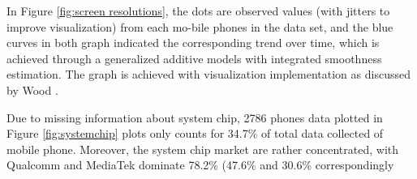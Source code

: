 \documentclass[utf8,english]{gradu3}
\begin{document}
In Figure \ref{fig:screen resolutions}, the dots are observed values (with jitters to improve visualization) from each mo-bile phones in the data set, and the blue curves in both graph indicated the corresponding trend over time, which is achieved through a generalized additive models with integrated smoothness estimation. The graph is achieved with visualization implementation as discussed by Wood \citeyear{wood2001mgcv}.

Due to missing information about system chip, 2786 phones data plotted in Figure \ref{fig:systemchip} plots only counts for 34.7\% of total data collected of mobile phone. Moreover, the system chip market are rather concentrated, with Qualcomm and MediaTek dominate 78.2\% (47.6\% and 30.6\% correspondingly
\end{document}
